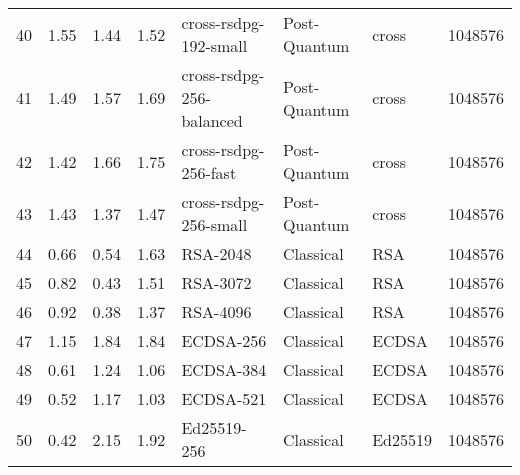\begin{table}
\begin{tabular}{lrrrlllr}
40 & 1.55 & 1.44 & 1.52 & cross-rsdpg-192-small & Post-Quantum & cross & 1048576 \\
41 & 1.49 & 1.57 & 1.69 & cross-rsdpg-256-balanced & Post-Quantum & cross & 1048576 \\
42 & 1.42 & 1.66 & 1.75 & cross-rsdpg-256-fast & Post-Quantum & cross & 1048576 \\
43 & 1.43 & 1.37 & 1.47 & cross-rsdpg-256-small & Post-Quantum & cross & 1048576 \\
44 & 0.66 & 0.54 & 1.63 & RSA-2048 & Classical & RSA & 1048576 \\
45 & 0.82 & 0.43 & 1.51 & RSA-3072 & Classical & RSA & 1048576 \\
46 & 0.92 & 0.38 & 1.37 & RSA-4096 & Classical & RSA & 1048576 \\
47 & 1.15 & 1.84 & 1.84 & ECDSA-256 & Classical & ECDSA & 1048576 \\
48 & 0.61 & 1.24 & 1.06 & ECDSA-384 & Classical & ECDSA & 1048576 \\
49 & 0.52 & 1.17 & 1.03 & ECDSA-521 & Classical & ECDSA & 1048576 \\
50 & 0.42 & 2.15 & 1.92 & Ed25519-256 & Classical & Ed25519 & 1048576 \\
\bottomrule
\end{tabular}
\end{table}
